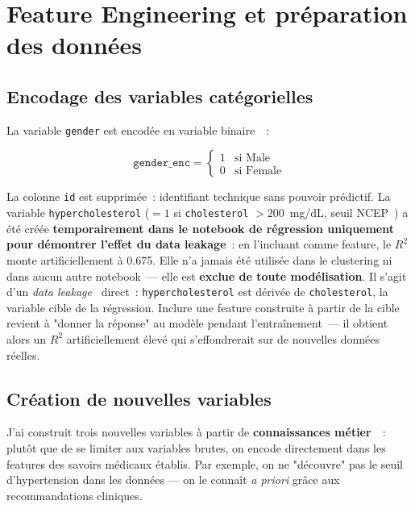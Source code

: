 \FloatBarrier

\section{Feature Engineering et préparation des données}

\subsection{Encodage des variables catégorielles}

La variable \texttt{gender} est encodée en variable binaire~\cite{hastie2009}~:

\begin{equation}
\texttt{gender\_enc} = \begin{cases} 1 & \text{si Male} \\ 0 & \text{si Female} \end{cases}
\end{equation}

La colonne \texttt{id} est supprimée~: identifiant technique sans pouvoir prédictif. La variable \texttt{hypercholesterol} ($= 1$ si \texttt{cholesterol} $> 200$~mg/dL, seuil NCEP~\cite{ncep2002}) a été créée \textbf{temporairement dans le notebook de régression uniquement pour démontrer l'effet du data leakage}~: en l'incluant comme feature, le $R^2$ monte artificiellement à 0.675. Elle n'a jamais été utilisée dans le clustering ni dans aucun autre notebook~--- elle est \textbf{exclue de toute modélisation}. Il s'agit d'un \textit{data leakage}~\cite{kaufman2012} direct~: \texttt{hypercholesterol} est dérivée de \texttt{cholesterol}, la variable cible de la régression. Inclure une feature construite à partir de la cible revient à "donner la réponse" au modèle pendant l'entraînement~--- il obtient alors un $R^2$ artificiellement élevé qui s'effondrerait sur de nouvelles données réelles.

\subsection{Création de nouvelles variables}

J'ai construit trois nouvelles variables à partir de \textbf{connaissances métier}~\cite{hastie2009}~: plutôt que de se limiter aux variables brutes, on encode directement dans les features des savoirs médicaux établis. Par exemple, on ne "découvre" pas le seuil d'hypertension dans les données --- on le connaît \textit{a priori} grâce aux recommandations cliniques.


